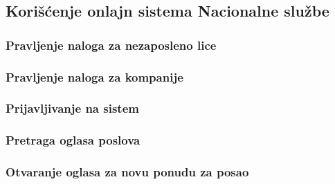 \subsection{Kori\v s\' cenje onlajn sistema Nacionalne slu\v zbe}

\subsubsection{Pravljenje naloga za nezaposleno lice}

\subsubsection{Pravljenje naloga za kompanije}

\subsubsection{Prijavljivanje na sistem}
\label{su: prijavljivanje na sistem}

\subsubsection{Pretraga oglasa poslova}

\subsubsection{Otvaranje oglasa za novu ponudu za posao}

\newpage